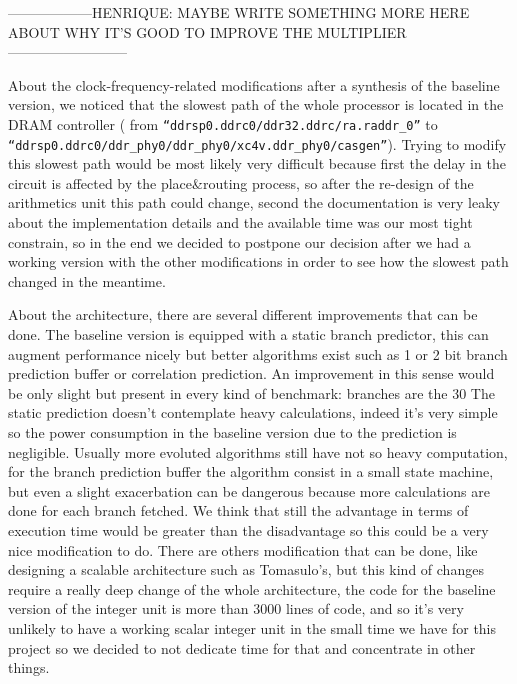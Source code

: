 ------------------HENRIQUE: MAYBE WRITE SOMETHING MORE HERE ABOUT WHY IT'S GOOD TO IMPROVE THE MULTIPLIER--------------------------

About the clock-frequency-related modifications after a synthesis of the baseline version, we noticed that the slowest path of the whole processor is located in the DRAM controller ( from \texttt{``ddrsp0.ddrc0/ddr32.ddrc/ra.raddr\_0''} to \texttt{``ddrsp0.ddrc0/ddr\_phy0/ddr\_phy0/xc4v.ddr\_phy0/casgen''}). Trying to modify this slowest path would be most likely very difficult because first the delay in the circuit is affected by the place\&routing process, so after the re-design of the arithmetics unit this path could change, second the documentation is very leaky about the implementation details and the available time was our most tight constrain, so in the end we decided to postpone our decision after we had a working version with the other modifications in order to see how the slowest path changed in the meantime.

About the architecture, there are several different improvements that can be done.
The baseline version is equipped with a static branch predictor, this can augment performance nicely but better algorithms exist such as 1 or 2 bit branch prediction buffer or correlation prediction.
An improvement in this sense would be only slight but present in every kind of benchmark: branches are the 30%
The static prediction doesn't contemplate heavy calculations, indeed it's very simple so the power consumption in the baseline version due to the prediction is negligible. Usually more evoluted algorithms still have not so heavy computation, for the branch prediction buffer the algorithm consist in a small state machine, but even a slight exacerbation can be dangerous because more calculations are done for each branch fetched. We think that still the advantage in terms of execution time would be greater than the disadvantage so this could be a very nice modification to do.
There are others modification that can be done, like designing a scalable architecture such as Tomasulo's, but this kind of changes require a really deep change of the whole architecture, the code for the baseline version of the integer unit is more than 3000 lines of code, and so it's very unlikely to have a working scalar integer unit in the small time we have for this project so we decided to not dedicate time for that and concentrate in other things.

